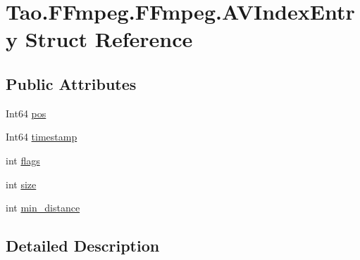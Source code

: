 \hypertarget{struct_tao_1_1_f_fmpeg_1_1_f_fmpeg_1_1_a_v_index_entry}{
\section{Tao.FFmpeg.FFmpeg.AVIndexEntry Struct Reference}
\label{struct_tao_1_1_f_fmpeg_1_1_f_fmpeg_1_1_a_v_index_entry}
}
\subsection*{Public Attributes}
\begin{DoxyCompactItemize}
\item 
Int64 \hyperlink{struct_tao_1_1_f_fmpeg_1_1_f_fmpeg_1_1_a_v_index_entry_a610e917106fcb2e2bb026faa18b84db0}{pos}
\item 
Int64 \hyperlink{struct_tao_1_1_f_fmpeg_1_1_f_fmpeg_1_1_a_v_index_entry_aa6598a924561433c02e3111761fc7591}{timestamp}
\item 
int \hyperlink{struct_tao_1_1_f_fmpeg_1_1_f_fmpeg_1_1_a_v_index_entry_a8a5ce7168c30c00c3e5540b4d9f790f0}{flags}
\item 
int \hyperlink{struct_tao_1_1_f_fmpeg_1_1_f_fmpeg_1_1_a_v_index_entry_a997f99cd105f41482411e62287cfad07}{size}
\item 
int \hyperlink{struct_tao_1_1_f_fmpeg_1_1_f_fmpeg_1_1_a_v_index_entry_a6322bec53a1a19cd6116934831dde55c}{min\_\-distance}
\end{DoxyCompactItemize}


\subsection{Detailed Description}



